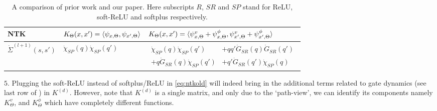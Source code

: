 \begin{table}[h]
{\begin{tabular}{|l|l|l|}
NTK			&$K_{\Theta}(x,x')=\langle \psi_{x,\Theta},\psi_{x',\Theta}\rangle$														&$K_{\Theta}(x,x')=\langle \psi^v_{x,\Theta}+\psi^{\phi}_{x,\Theta},\psi^v_{x',\Theta}+\psi^{\phi}_{x',\Theta}\rangle$	\\\hline		
$\dot{\Sigma}^{(l+1)}(s,s')$	&$\dot{\chi}_{SP}(q)\dot{\chi}_{SP}(q')$ &$\begin{aligned}\dot{\chi}_{SP}(q)\dot{\chi}_{SP}(q')&+qq'\dot{G}_{SR}(q)\dot{G}_{SR}(q')\\ +q\dot{G}_{SR}(q)\dot{\chi}_{SP}(q')&+q'\dot{G}_{SR}(q')\dot{\chi}_{SP}(q)\end{aligned}$\\\hline


\end{tabular}
}
\caption{A comparison of prior work and our paper. Here subscripts $R$, $SR$ and $SP$ stand for ReLU, soft-ReLU and softplus respectively.}
\label{tb:compare}
\end{table}
$5.$ Plugging the soft-ReLU instead of softplus/ReLU in \eqref{eq:ntkold} will indeed bring in the additional terms related to gate dynamics (see last row of ) in $K^{(d)}$. However, note that $K^{(d)}$ is a single matrix, and only due to the `path-view', we can identify its components namely $K^v_{\Theta}$, and $K^{\phi}_{\Theta}$ which have completely different functions.

